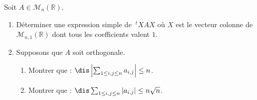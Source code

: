 \documentclass[a4paper,10pt]{report}
\begin{document}

\begin{Exercice}{} Soit $A \in \mathcal{M}_n(\mathbb{R})$.

\begin{enumerate}
\item Déterminer une expression simple de $~^tX A X$ où $X$ est le vecteur colonne de $\mathcal{M}_{n,1}(\mathbb{R})$ dont tous les coefficients valent $1$.  
\item Supposons que $A$ soit orthogonale.
\begin{enumerate}
\item Montrer que : $\dis \left\vert \sum_{1 \leq i,j \leq n} a_{i,j} \right\vert \leq n$.
\item Montrer que : $\dis  \sum_{1 \leq i,j \leq n} \vert a_{i,j} \vert  \leq n \sqrt{n}$.
\end{enumerate}
\end{enumerate}
\end{Exercice}
\end{document}
